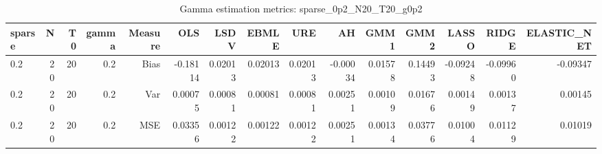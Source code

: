 \begin{table}[!htbp]\centering
\caption{Gamma estimation metrics: sparse_0p2_N20_T20_g0p2}
\label{tab:table1_sparse_0p2_N20_T20_g0p2}
\begin{tabular}{lrrrrrrrrrrrrrr}
\hline
sparse & N & T0 & gamma & Measure & OLS & LSDV & EBMLE & URE & AH & GMM1 & GMM2 & LASSO & RIDGE & ELASTIC_NET \\
\hline
0.2 & 20 & 20 & 0.2 & Bias & -0.18114 & 0.02013 & 0.02013 & 0.02013 & -0.00034 & 0.01578 & 0.14493 & -0.09248 & -0.09960 & -0.09347 \\
0.2 & 20 & 20 & 0.2 & Var & 0.00075 & 0.00081 & 0.00081 & 0.00081 & 0.00251 & 0.00109 & 0.01676 & 0.00149 & 0.00137 & 0.00145 \\
0.2 & 20 & 20 & 0.2 & MSE & 0.03356 & 0.00122 & 0.00122 & 0.00122 & 0.00251 & 0.00134 & 0.03776 & 0.01004 & 0.01129 & 0.01019 \\
\hline
\end{tabular}
\end{table}

